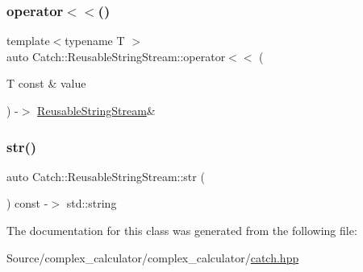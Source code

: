 \mbox{\label{class_catch_1_1_reusable_string_stream_af95f72024c082db70e5e50782e28e4f6}} 
\subsubsection{\texorpdfstring{operator$<$$<$()}{operator<<()}}
{\footnotesize\ttfamily template$<$typename T $>$ \\
auto Catch\+::\+Reusable\+String\+Stream\+::operator$<$$<$ (\begin{DoxyParamCaption}\item[{T const \&}]{value }\end{DoxyParamCaption}) -\/$>$ \mbox{\hyperlink{class_catch_1_1_reusable_string_stream}{Reusable\+String\+Stream}}\& \hspace{0.3cm}{\ttfamily [inline]}}

\mbox{\label{class_catch_1_1_reusable_string_stream_a0e9ecf260b2a5d35f4886ef0d51f6270}} 
\subsubsection{\texorpdfstring{str()}{str()}}
{\footnotesize\ttfamily auto Catch\+::\+Reusable\+String\+Stream\+::str (\begin{DoxyParamCaption}{ }\end{DoxyParamCaption}) const -\/$>$  std\+::string}



The documentation for this class was generated from the following file\+:\begin{DoxyCompactItemize}
\item 
Source/complex\+\_\+calculator/complex\+\_\+calculator/\mbox{\hyperlink{catch_8hpp}{catch.\+hpp}}\end{DoxyCompactItemize}
